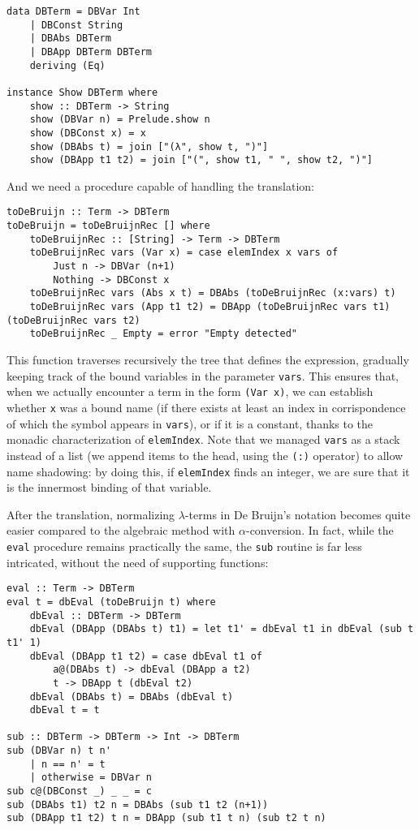 \documentclass{article}
\begin{document}
\begin{lstlisting}
data DBTerm = DBVar Int
    | DBConst String
    | DBAbs DBTerm
    | DBApp DBTerm DBTerm
    deriving (Eq)

instance Show DBTerm where
    show :: DBTerm -> String
    show (DBVar n) = Prelude.show n
    show (DBConst x) = x
    show (DBAbs t) = join ["(λ", show t, ")"]
    show (DBApp t1 t2) = join ["(", show t1, " ", show t2, ")"]
\end{lstlisting}

And we need a procedure capable of handling the translation:

\begin{lstlisting}
toDeBruijn :: Term -> DBTerm
toDeBruijn = toDeBruijnRec [] where
    toDeBruijnRec :: [String] -> Term -> DBTerm
    toDeBruijnRec vars (Var x) = case elemIndex x vars of
        Just n -> DBVar (n+1)
        Nothing -> DBConst x
    toDeBruijnRec vars (Abs x t) = DBAbs (toDeBruijnRec (x:vars) t)
    toDeBruijnRec vars (App t1 t2) = DBApp (toDeBruijnRec vars t1) (toDeBruijnRec vars t2)
    toDeBruijnRec _ Empty = error "Empty detected"
\end{lstlisting}

This function traverses recursively the tree that defines the expression, gradually keeping track of the bound variables in the parameter \lstinline|vars|. This ensures that, when we actually encounter a term in the form \lstinline|(Var x)|, we can establish whether \lstinline|x| was a bound name (if there exists at least an index in corrispondence of which the symbol appears in \lstinline|vars|), or if it is a constant, thanks to the monadic characterization of \lstinline|elemIndex|. Note that we managed \lstinline|vars| as a stack instead of a list (we append items to the head, using the \lstinline|(:)| operator) to allow name shadowing: by doing this, if \lstinline|elemIndex| finds an integer, we are sure that it is the innermost binding of that variable.

After the translation, normalizing $\lambda$-terms in De Bruijn's notation becomes quite easier compared to the algebraic method with $\alpha$-conversion. In fact, while the \lstinline|eval| procedure remains practically the same, the \lstinline|sub| routine is far less intricated, without the need of supporting functions:

\begin{lstlisting}
eval :: Term -> DBTerm
eval t = dbEval (toDeBruijn t) where
    dbEval :: DBTerm -> DBTerm
    dbEval (DBApp (DBAbs t) t1) = let t1' = dbEval t1 in dbEval (sub t t1' 1)
    dbEval (DBApp t1 t2) = case dbEval t1 of
        a@(DBAbs t) -> dbEval (DBApp a t2)
        t -> DBApp t (dbEval t2)
    dbEval (DBAbs t) = DBAbs (dbEval t)
    dbEval t = t

sub :: DBTerm -> DBTerm -> Int -> DBTerm
sub (DBVar n) t n'
    | n == n' = t
    | otherwise = DBVar n
sub c@(DBConst _) _ _ = c
sub (DBAbs t1) t2 n = DBAbs (sub t1 t2 (n+1))
sub (DBApp t1 t2) t n = DBApp (sub t1 t n) (sub t2 t n)
\end{lstlisting}
\end{document}
